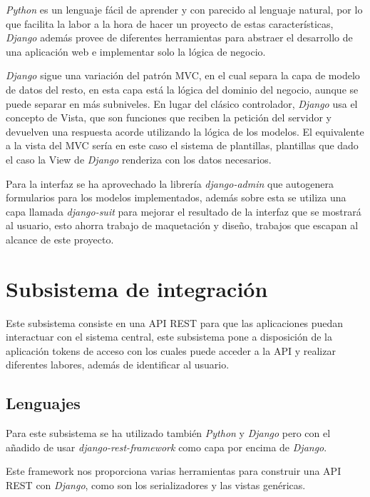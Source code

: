 \documentclass[12pt,a4paperpaper,]{report}
\begin{document}
\emph{Python} es un lenguaje fácil de aprender y con parecido al
lenguaje natural, por lo que facilita la labor a la hora de hacer un
proyecto de estas características, \emph{Django} además provee de
diferentes herramientas para abstraer el desarrollo de una aplicación
web e implementar solo la lógica de negocio.

\emph{Django} sigue una variación del patrón MVC, en el cual separa la
capa de modelo de datos del resto, en esta capa está la lógica del
dominio del negocio, aunque se puede separar en más subniveles. En lugar
del clásico controlador, \emph{Django} usa el concepto de Vista, que son
funciones que reciben la petición del servidor y devuelven una respuesta
acorde utilizando la lógica de los modelos. El equivalente a la vista
del MVC sería en este caso el sistema de plantillas, plantillas que dado
el caso la View de \emph{Django} renderiza con los datos necesarios.

Para la interfaz se ha aprovechado la librería \emph{django-admin} que
autogenera formularios para los modelos implementados, además sobre esta
se utiliza una capa llamada \emph{django-suit} para mejorar el resultado
de la interfaz que se mostrará al usuario, esto ahorra trabajo de
maquetación y diseño, trabajos que escapan al alcance de este proyecto.

\section{Subsistema de integración}\label{subsistema-de-integraciuxf3n}

Este subsistema consiste en una API REST para que las aplicaciones
puedan interactuar con el sistema central, este subsistema pone a
disposición de la aplicación tokens de acceso con los cuales puede
acceder a la API y realizar diferentes labores, además de identificar al
usuario.

\subsection{Lenguajes}\label{lenguajes-1}

Para este subsistema se ha utilizado también \emph{Python} y
\emph{Django} pero con el añadido de usar \emph{django-rest-framework}
como capa por encima de \emph{Django}.

Este framework nos proporciona varias herramientas para construir una
API REST con \emph{Django}, como son los serializadores y las vistas
genéricas.
\end{document}
